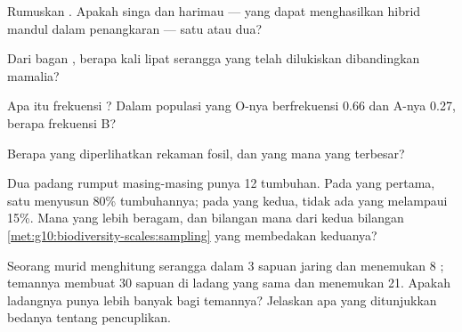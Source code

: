 \begin{exercise}[$\star$]\label{exo:g10:biodiversity-scales:2}
Rumuskan . Apakah singa dan harimau --- yang dapat menghasilkan
hibrid mandul dalam penangkaran --- satu  atau dua?
\end{exercise}

\begin{exercise}[$\star$]\label{exo:g10:biodiversity-scales:3}
Dari bagan , berapa kali lipat  serangga yang telah
dilukiskan dibandingkan  mamalia?
\end{exercise}

\begin{exercise}[$\star$]\label{exo:g10:biodiversity-scales:4}
Apa itu frekuensi ? Dalam populasi yang  O-nya berfrekuensi
0.66 dan  A-nya 0.27, berapa frekuensi B?
\end{exercise}

\begin{exercise}[$\star$]\label{exo:g10:biodiversity-scales:5}
Berapa  yang diperlihatkan rekaman fosil, dan yang mana
yang terbesar?
\end{exercise}

\begin{exercise}[$\star\star$]\label{exo:g10:biodiversity-scales:6}
Dua padang rumput masing-masing punya 12  tumbuhan. Pada yang
pertama, satu  menyusun 80\% tumbuhannya; pada yang kedua, tidak
ada  yang melampaui 15\%. Mana yang lebih beragam, dan bilangan
mana dari kedua bilangan \cref{met:g10:biodiversity-scales:sampling}
yang membedakan keduanya?
\end{exercise}

\begin{exercise}[$\star\star$]\label{exo:g10:biodiversity-scales:7}
Seorang murid menghitung serangga dalam 3 sapuan jaring dan menemukan 8
; temannya membuat 30 sapuan di ladang yang sama dan menemukan
21. Apakah ladangnya punya lebih banyak  bagi temannya?
Jelaskan apa yang ditunjukkan bedanya tentang pencuplikan.
\end{exercise}

